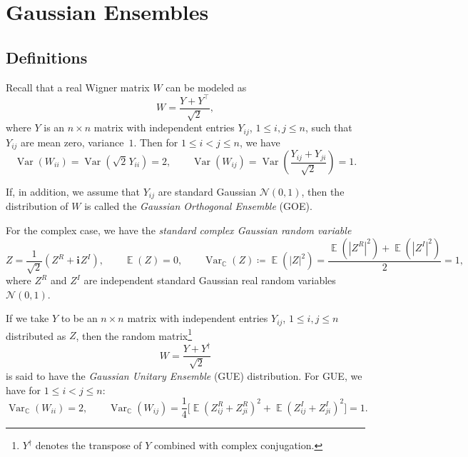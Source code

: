 \documentclass[letterpaper,11pt,oneside,reqno]{article}
\numberwithin{equation}{section}
\newcommand{\ssp}{\hspace{1pt}}
\theoremstyle{definition}
\begin{document}
\section{Gaussian Ensembles}

\subsection{Definitions}
\label{sub:GOE_GUE_definitons}

Recall that a real Wigner matrix $W$ can be modeled as
\begin{equation*}
	W=\frac{Y+Y^\top}{\sqrt{2}},
\end{equation*}
where $Y$ is an $n\times n$ matrix with independent entries $Y_{ij}$,
$1\le i,j\le n$, such that $Y_{ij}$ are mean zero, variance~$1$.
Then for $1\le i<j\le n$, we have
\begin{equation*}
	\operatorname{\mathrm{Var}}\left( W_{ii} \right)=
	\operatorname{\mathrm{Var}}( \sqrt 2\ssp Y_{ii} )=2,\qquad
	\operatorname{\mathrm{Var}}\left( W_{ij} \right)=
	\operatorname{\mathrm{Var}}\left( \frac{Y_{ij}+Y_{ji}}{\sqrt 2} \right)=1.
\end{equation*}

If, in addition, we assume that $Y_{ij}$ are standard Gaussian
$\mathcal{N}(0,1)$, then the distribution of $W$ is called
the \emph{Gaussian Orthogonal Ensemble} (GOE).

For the complex case, we
have the \emph{standard complex Gaussian random variable}
\begin{equation*}
	Z=\frac{1}{\sqrt 2}\left( Z^R+\mathbf{i}\ssp Z^I \right),
	\qquad
	\operatorname{\mathbb{E}} (Z)=0,
	\qquad
	\operatorname{\mathrm{Var}}_{\mathbb{C}}(Z)\coloneqq
	\operatorname{\mathbb{E}} (|Z|^2)=
	\frac{
	\operatorname{\mathbb{E}} (|Z^R|^2)+
	\operatorname{\mathbb{E}} (|Z^I|^2)}{2}=1
	,
\end{equation*}
where $Z^R$ and $Z^I$ are independent
standard Gaussian real random variables $\mathcal{N}(0,1)$.

If we take $Y$ to be an $n\times n$ matrix with independent
entries $Y_{ij}$, $1\le i,j\le n$
distributed as $Z$, then the random matrix\footnote{$Y^\dagger$ denotes the transpose of $Y$ combined with complex conjugation.}
\begin{equation*}
	W=\frac{Y+Y^\dagger}{\sqrt 2}
\end{equation*}
is said to have the \emph{Gaussian Unitary Ensemble} (GUE) distribution.
For GUE,
we have for $1\le i<j\le n$:
\begin{equation*}
	\operatorname{\mathrm{Var}}_{\mathbb{C}}(W_{ii})=2,
	\qquad 
	\operatorname{\mathrm{Var}}_{\mathbb{C}}(W_{ij})
	=\frac{1}{4}
	\bigl[ \operatorname{\mathbb{E}}(Z_{ij}^R
			+
		Z_{ji}^R)^2
		+
		\operatorname{\mathbb{E}}(Z_{ij}^I
			+
		Z_{ji}^I)^2
	\bigr]
	=1.
\end{equation*}
\end{document}
